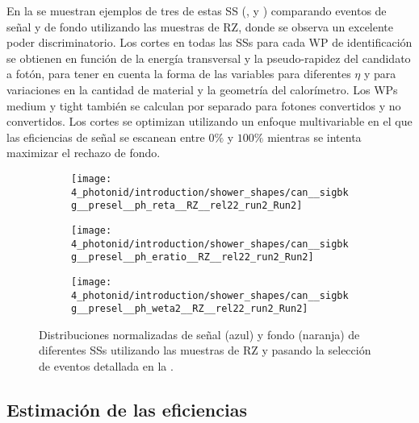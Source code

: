 En la \Fig{\ref{fig:pid_ss:optimisation:shower_shapes}} se muestran ejemplos de tres de estas \ac{SS} (\reta, \eratio y \weta) comparando eventos de señal y de fondo utilizando las muestras de \ac{RZ}, donde se observa un excelente poder discriminatorio.
Los cortes en todas las \acp{SS} para cada \ac{WP} de identificación se obtienen en función de la energía transversal y la pseudo-rapidez del candidato a fotón, para tener en cuenta la forma de las variables para diferentes \(\eta\) y para variaciones en la cantidad de material y la geometría del calorímetro. Los \acp{WP} medium y tight también se calculan por separado para fotones convertidos y no convertidos.
Los cortes se optimizan utilizando un enfoque multivariable en el que las eficiencias de señal se escanean entre \(0\%\) y \(100\%\) mientras se intenta maximizar el rechazo de fondo.

\begin{figure}[ht!]
    \centering
    \begin{subfigure}[h]{0.32\linewidth}
        \centering
        \texttt{[image: 4\_photonid/introduction/shower\_shapes/can\_\_sigbkg\_\_presel\_\_ph\_reta\_\_RZ\_\_rel22\_run2\_Run2]}
        \caption{\reta}
        \label{fig:pid_ss:optimisation:shower_shapes:reta}
    \end{subfigure}
    \hfill
    \begin{subfigure}[h]{0.32\linewidth}
        \centering
        \texttt{[image: 4\_photonid/introduction/shower\_shapes/can\_\_sigbkg\_\_presel\_\_ph\_eratio\_\_RZ\_\_rel22\_run2\_Run2]}
        \caption{\eratio}
        \label{fig:pid_ss:optimisation:shower_shapes:eratio}
    \end{subfigure}
    \hfill
    \begin{subfigure}[h]{0.32\linewidth}
        \centering
        \texttt{[image: 4\_photonid/introduction/shower\_shapes/can\_\_sigbkg\_\_presel\_\_ph\_weta2\_\_RZ\_\_rel22\_run2\_Run2]}
        \caption{\weta}
        \label{fig:pid_ss:optimisation:shower_shapes:weta2}
    \end{subfigure}
    \caption{Distribuciones normalizadas de señal (azul) y fondo (naranja) de diferentes \acp{SS} utilizando las muestras de \ac{RZ} y pasando la selección de eventos detallada en la \Sect{\ref{subsec:pid_ss:pid:event_selection}}.}
    \label{fig:pid_ss:optimisation:shower_shapes}
\end{figure}



\subsection{Estimación de las eficiencias}

